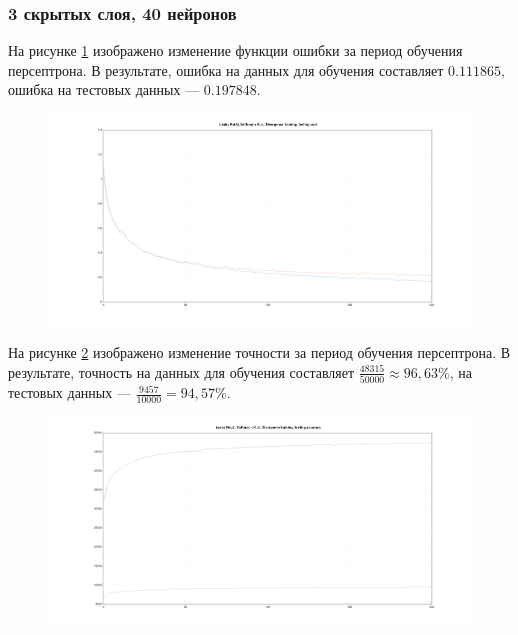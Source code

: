 \documentclass[a4paper, 14pt]{extarticle}
\begin{document}
\subsubsection{3 скрытых слоя, 40 нейронов}


На рисунке \ref{fig:3_40_leaky_relu_softmax_kl_divergence_cost} изображено изменение функции ошибки за период обучения персептрона.
В результате, ошибка на данных для обучения составляет $0.111865$, ошибка на тестовых данных --- $0.197848$.

\begin{figure}[!htb]
  \centering\includegraphics[width=\textwidth]{images/3_40_leaky_relu_softmax_kl_divergence_cost.png}
  \caption{}
  \label{fig:3_40_leaky_relu_softmax_kl_divergence_cost}
\end{figure}

На рисунке \ref{fig:3_40_leaky_relu_softmax_kl_divergence_accuracy} изображено изменение точности за период обучения персептрона.
В результате, точность на данных для обучения составляет $\frac{48315}{50000} \approx 96,63\%$, на тестовых данных --- $\frac{9457}{10000} = 94,57\%$.

\begin{figure}[!htb]
  \centering\includegraphics[width=\textwidth]{images/3_40_leaky_relu_softmax_kl_divergence_accuracy.png}
  \caption{}
  \label{fig:3_40_leaky_relu_softmax_kl_divergence_accuracy}
\end{figure}
\end{document}
